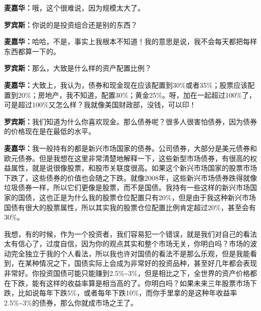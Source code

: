 \begin{BookQuote}
\textbf{麦嘉华：}哦，这个很难说，因为规模太大了。
\end{BookQuote}

\begin{BookQuote}
\textbf{罗宾斯：}你说的是投资组合还是别的东西？
\end{BookQuote}

\begin{BookQuote}
\textbf{麦嘉华：}哈哈，不是，事实上我根本不知道！我的意思是说，我不会每天都把每样东西都算一下的。
\end{BookQuote}

\begin{BookQuote}
\textbf{罗宾斯：}那么，大致是什么样的资产配置比例？
\end{BookQuote}

\begin{BookQuote}
\textbf{麦嘉华：}大致上，我认为，债券和现金现在应该配置到30\%或者35\%；股票应该配置到20\%；房地产，我不知道，配置30\%；黄金25\%。呀，加在一起超过100\%了，可是超过100\%又怎么样？我就像美国财政部，没钱，可以印！
\end{BookQuote}

\begin{BookQuote}
\textbf{罗宾斯：}我们知道为什么你喜欢现金。那么债券呢？很多人很害怕债券，因为债券的价格现在是在最低的水平。
\end{BookQuote}

\begin{BookQuote}
\textbf{麦嘉华：}我一般持有的都是新兴市场国家的债券。公司债券，大部分是美元债券和欧元债券。但是我想在这里非常清楚地解释一下，这些新型市场债券，有很高的权益属性，就是说很像股票，和股市关联度很高。如果这个新兴市场国家的股票市场下跌了，这些债券的价值也会随之下跌。就像2008年，这些新兴市场债券跌得就像垃圾债券一样，所以它们更像是股票，而不是国债。我持有一些这样的新兴市场国家的国债，这也正是为什么我的股票仓位配置只有20\%，但是由于我这种新兴市场国债有很大的股票属性，所以其实我的股票仓位配置比例肯定超过20\%，甚至会有30\%。
\end{BookQuote}

我想，有的时候，作为一个投资者，我们容易犯一个错误，就是我们对自己的看法太有信心了，过度自信，因为你的观点其实和整个市场无关，你明白吗？市场的波动完全独立于我的个人看法，所以我也许对国债的看法不是那么乐观，但是我能看到，在某种情况之下，国债实际上会成为非常好的投资品种，甚至好几年都会表现非常好。你投资国债可能只能赚到2.5\%\textasciitilde{}3\%，但是相比之下，全世界的资产价格都在下跌，能有这样的收益率算是相当高的了。你明白吗？如果未来三年股票市场下跌，比如说每年下跌5\%，或者每年下跌10\%，而你手里拿的是这种年收益率2.5\%\textasciitilde{}3\%的债券，那么你就成市场之王了。

